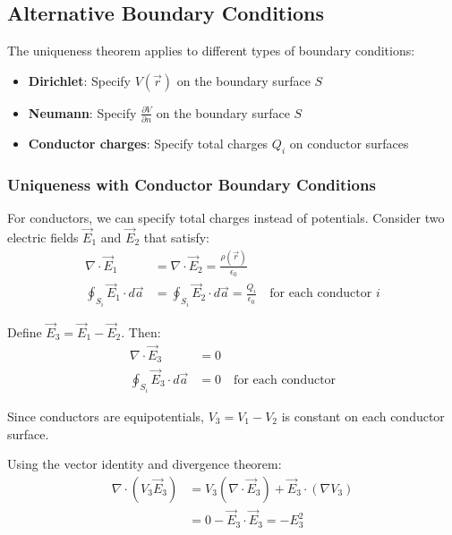 \documentclass{article}
\begin{document}
\subsection{Alternative Boundary Conditions}

\begin{conceptbox}
The uniqueness theorem applies to different types of boundary conditions:
\begin{itemize}
    \item \textbf{Dirichlet}: Specify $V(\vec{r})$ on the boundary surface $S$
    \item \textbf{Neumann}: Specify $\frac{\partial V}{\partial n}$ on the boundary surface $S$  
    \item \textbf{Conductor charges}: Specify total charges $Q_i$ on conductor surfaces
\end{itemize}
\end{conceptbox}

\subsubsection{Uniqueness with Conductor Boundary Conditions}

For conductors, we can specify total charges instead of potentials. Consider two electric fields $\vec{E}_1$ and $\vec{E}_2$ that satisfy:
\begin{align*}
    \nabla \cdot \vec{E}_1 &= \nabla \cdot \vec{E}_2 = \frac{\rho(\vec{r})}{\epsilon_0} \\
    \oint_{S_i} \vec{E}_1 \cdot d\vec{a} &= \oint_{S_i} \vec{E}_2 \cdot d\vec{a} = \frac{Q_i}{\epsilon_0} \quad \text{for each conductor } i
\end{align*}

Define $\vec{E}_3 = \vec{E}_1 - \vec{E}_2$. Then:
\begin{align*}
    \nabla \cdot \vec{E}_3 &= 0 \\
    \oint_{S_i} \vec{E}_3 \cdot d\vec{a} &= 0 \quad \text{for each conductor}
\end{align*}

Since conductors are equipotentials, $V_3 = V_1 - V_2$ is constant on each conductor surface.

Using the vector identity and divergence theorem:
\begin{align*}
    \nabla \cdot (V_3 \vec{E}_3) &= V_3(\nabla \cdot \vec{E}_3) + \vec{E}_3 \cdot (\nabla V_3) \\
    &= 0 - \vec{E}_3 \cdot \vec{E}_3 = -E_3^2
\end{align*}
\end{document}
